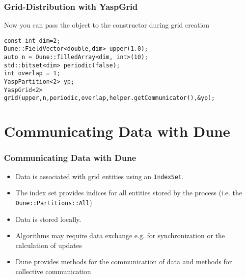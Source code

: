 \begin{frame}[fragile]
  \frametitle<presentation>{Grid-Distribution with YaspGrid}
Now you can pass the object to the constructor during grid creation
\begin{lstlisting}[breaklines=true]
const int dim=2;
Dune::FieldVector<double,dim> upper(1.0);
auto n = Dune::filledArray<dim, int>(10);
std::bitset<dim> periodic(false);
int overlap = 1;
YaspPartition<2> yp;
YaspGrid<2> grid(upper,n,periodic,overlap,helper.getCommunicator(),&yp);
\end{lstlisting}
\end{frame}

\section{Communicating Data with Dune}
\begin{frame}[fragile]
  \frametitle<presentation>{Communicating Data with Dune}


  \begin{itemize}
  \item Data is associated with grid entities using an \texttt{IndexSet}.
  \item The index set provides indices for all entities stored by the process (i.e. the \lstinline!Dune::Partitions::All!)
  \item Data is stored locally.
  \item Algorithms may require data exchange e.g. for synchronization or the calculation of updates
  \item Dune provides methods for the communication of data and methods for collective communication
  \end{itemize}

\end{frame}


